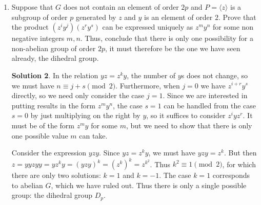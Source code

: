 \documentclass{article}
\theoremstyle{definition}
\newtheorem*{solution}{Solution}
\begin{document}
\begin{enumerate}
\begin{enumerate}
\begin{solution}
The elements $z^iy^0$ for $0 \le i < p$ are an enumeration of $P = \langle z \rangle$, and $z^iy^1$ for $0 \le i < p$ are then an enumeration of $Py$.  These are the two cosets of $P$ in $G$, giving all the elements.
\end{solution}
\item Suppose that $G$ does not contain an element of order $2p$ and $P = \langle z \rangle$ is a subgroup of order $p$ generated by $z$ and $y$ is an element of order $2$. Prove that the product $(z^iy^j)(z^ry^s)$ can be expressed uniquely as $z^my^n$ for some non negative integers $m, n$. Thus, conclude that there is only one possibility for a non-abelian group of order $2p$, it must therefore be the one we have seen already, the dihedral group.
\begin{solution}
In the relation $yz = z^ky$, the number of $y$s does not change, so we must have $n \equiv j+s \pmod{2}$.  Furthermore, when $j=0$ we have $z^{i+r}y^s$ directly, so we need only consider the case $j=1$.  Since we are interested in putting results in the form $z^my^n$, the case $s=1$ can be handled from the case $s=0$ by just multiplying on the right by $y$, so it suffices to consider $z^iyz^r$.  It must be of the form $z^my$ for some $m$, but we need to show that there is only one possible value $m$ can take.

Consider the expression $yzy$.  Since $yz = z^ky$, we must have $yzy = z^k$.  But then $z = yyzyy = yz^ky = (yzy)^k = (z^k)^k = z^{k^2}$.  Thus $k^2 \equiv 1 \pmod{2}$, for which there are only two solutions: $k=1$ and $k=-1$.  The case $k=1$ corresponds to abelian $G$, which we have ruled out.  Thus there is only a single possible group: the dihedral group $D_p$.
\end{solution}
\end{enumerate}
\end{enumerate}
\end{document}
